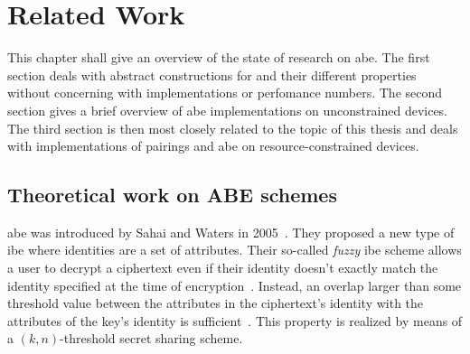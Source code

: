 \chapter{Related Work}\label{chap:related-work}

This chapter shall give an overview of the state of research on \acrshort{abe}.
The first section deals with abstract constructions for  and their different properties without concerning with implementations or perfomance numbers.
The second section gives a brief overview of \acrshort{abe} implementations on unconstrained devices.
The third section is then most closely related to the topic of this thesis and deals with implementations of pairings and \acrshort{abe} on resource-constrained devices.



\section{Theoretical work on ABE schemes}
\acrlong{abe} was introduced by Sahai and Waters in 2005~\cite{sahai_fuzzy_2005}.
They proposed a new type of \gls{ibe} where identities are a set of attributes.
Their so-called \emph{fuzzy} \gls{ibe} scheme allows a user to decrypt a ciphertext even if their identity doesn't exactly match the identity specified at the time of encryption~\cite{sahai_fuzzy_2005}.
Instead, an overlap larger than some threshold value between the attributes in the ciphertext's identity with the attributes of the key's identity is sufficient~\cite{sahai_fuzzy_2005}.
This property is realized by means of a $(k, n)$-threshold secret sharing scheme.

